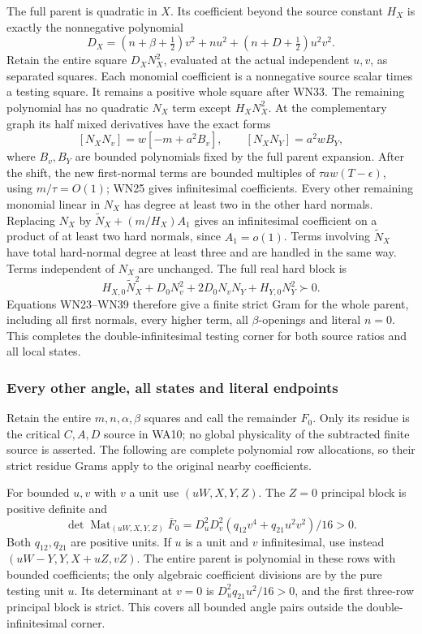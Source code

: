 The full parent is quadratic in \(X\). Its coefficient beyond
the source constant \(H_X\) is exactly the nonnegative polynomial
\[
 D_X=(n+\beta+\tfrac12)v^2+nu^2+
                         (n+D+\tfrac12)u^2v^2 .
 \tag{WN37}
\]
Retain the entire square \(D_XN_X^2\), evaluated at the actual
independent \(u,v\), as separated squares. Each monomial coefficient
is a nonnegative source scalar times a testing square. It remains
a positive whole square after WN33.
The remaining polynomial has no quadratic \(N_X\) term except
\(H_XN_X^2\). At the complementary graph its half mixed
derivatives have the exact forms
\[
 [N_XN_v]=w[-m+a^2B_v],\qquad
 [N_XN_Y]=a^2wB_Y,
 \tag{WN38}
\]
where \(B_v,B_Y\) are bounded polynomials fixed by the full
parent expansion. After the shift, the new first-normal terms
are bounded multiples of \(\tau aw(T-\epsilon)\), using
\(m/\tau=O(1)\); WN25 gives infinitesimal coefficients.
Every other remaining monomial linear in \(N_X\) has degree at
least two in the other hard normals. Replacing \(N_X\) by
\(\widetilde N_X+(m/H_X)A_1\) gives an infinitesimal coefficient
on a product of at least two hard normals, since \(A_1=o(1)\).
Terms involving \(\widetilde N_X\) have total hard-normal
degree at least three and are handled in the same way.
Terms independent of \(N_X\) are unchanged. The full real hard block is
\[
 H_{X,0}\widetilde N_X^2+
       D_0N_v^2+2D_0N_vN_Y+H_{Y,0}N_Y^2\succ0.
 \tag{WN39}
\]
Equations WN23--WN39 therefore give a finite strict Gram for
the whole parent, including all first normals, every higher term,
all \(\beta\)-openings and literal \(n=0\).
This completes the double-infinitesimal testing corner for both
source ratios and all local states.

\subsubsection*{Every other angle, all states and literal endpoints}

Retain the entire \(m,n,\alpha,\beta\) squares and call the
remainder \(F_0\). Only its residue is the critical \(C,A,D\)
source in WA10; no global physicality of the subtracted finite
source is asserted. The following are complete polynomial row
allocations, so their strict residue Grams apply to the original
nearby coefficients.

For bounded \(u,v\) with \(v\) a unit use \((uW,X,Y,Z)\).
The \(Z=0\) principal block is positive definite and
\[
 \det\operatorname{Mat}_{(uW,X,Y,Z)}\bar F_0
 =D_u^2D_v^2(q_{12}v^4+q_{21}u^2v^2)/16>0.
 \tag{WN40}
\]
Both \(q_{12},q_{21}\) are positive units. If \(u\) is a unit
and \(v\) infinitesimal, use instead
\((uW-Y,Y,X+uZ,vZ)\). The entire parent is polynomial in
these rows with bounded coefficients; the only algebraic
coefficient divisions are by the pure testing unit \(u\).
Its determinant at \(v=0\) is
\(D_u^2q_{21}u^2/16>0\), and the first three-row principal block
is strict. This covers all bounded angle pairs outside the
double-infinitesimal corner.

